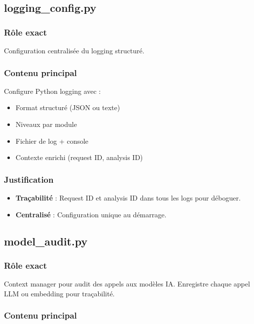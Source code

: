 \documentclass[12pt,a4paper,oneside]{book}
\begin{document}
\subsection{logging\_config.py}

\subsubsection{Rôle exact}

Configuration centralisée du logging structuré.

\subsubsection{Contenu principal}

Configure Python logging avec :
\begin{itemize}
    \item Format structuré (JSON ou texte)
    \item Niveaux par module
    \item Fichier de log + console
    \item Contexte enrichi (request ID, analysis ID)
\end{itemize}

\subsubsection{Justification}

\begin{itemize}
    \item \textbf{Traçabilité} : Request ID et analysis ID dans tous les logs pour déboguer.
    
    \item \textbf{Centralisé} : Configuration unique au démarrage.
\end{itemize}

\subsection{model\_audit.py}

\subsubsection{Rôle exact}

Context manager pour audit des appels aux modèles IA. Enregistre chaque appel LLM ou embedding pour traçabilité.

\subsubsection{Contenu principal}
\end{document}
